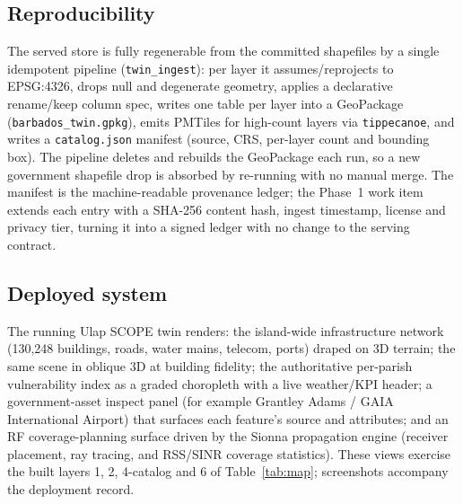 \documentclass[10pt,twocolumn]{article}
\begin{document}
\subsection{Reproducibility}
The served store is fully regenerable from the committed shapefiles by a single
idempotent pipeline (\texttt{twin\_ingest}): per layer it assumes/reprojects to
EPSG:4326, drops null and degenerate geometry, applies a declarative rename/keep
column spec, writes one table per layer into a GeoPackage
(\texttt{barbados\_twin.gpkg}), emits PMTiles for high-count layers via
\texttt{tippecanoe}, and writes a \texttt{catalog.json} manifest (source, CRS,
per-layer count and bounding box). The pipeline deletes and rebuilds the GeoPackage
each run, so a new government shapefile drop is absorbed by re-running with no manual
merge. The manifest is the machine-readable provenance ledger; the Phase~1 work item
extends each entry with a SHA-256 content hash, ingest timestamp, license and privacy
tier, turning it into a signed ledger with no change to the serving contract.

\subsection{Deployed system}
The running Ulap SCOPE twin renders: the island-wide infrastructure network
(130{,}248 buildings, roads, water mains, telecom, ports) draped on 3D terrain; the
same scene in oblique 3D at building fidelity; the authoritative per-parish
vulnerability index as a graded choropleth with a live weather/KPI header; a
government-asset inspect panel (for example Grantley Adams / GAIA International
Airport) that surfaces each feature's source and attributes; and an RF
coverage-planning surface driven by the Sionna propagation engine (receiver
placement, ray tracing, and RSS/SINR coverage statistics). These views exercise the
built layers 1, 2, 4-catalog and 6 of Table~\ref{tab:map}; screenshots accompany the
deployment record.
\end{document}
